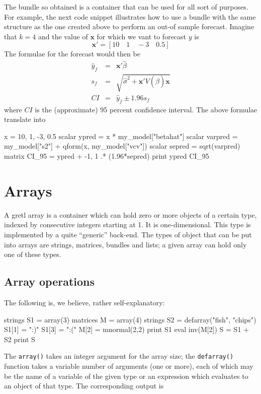 The bundle so obtained is a container that can be used for all sort of
purposes. For example, the next code snippet illustrates how to use
a bundle with the same structure as the one created above to perform
an out-of sample forecast. Imagine that $k=4$ and the value of
$\mathbf{x}$ for which we vant to forecast $y$ is
\[
  \mathbf{x}' = [ 10 \quad 1  \quad -3 \quad 0.5 ]
\]
The formulae for the forecast would then be
\begin{eqnarray*}
  \hat{y}_f & = & \mathbf{x}'\hat{\beta} \\
  s_f & = & \sqrt{\hat{\sigma}^2 + \mathbf{x}'V(\hat{\beta})\mathbf{x}} \\
  CI & = & \hat{y}_f \pm 1.96 s_f 
\end{eqnarray*}
where $CI$ is the (approximate) 95 percent confidence interval. The
above formulae translate into
\begin{code}
  x = { 10, 1, -3, 0.5 }
  scalar ypred    = x * my_model["betahat"]
  scalar varpred  = my_model["s2"] + qform(x, my_model["vcv"])
  scalar sepred   = sqrt(varpred)
  matrix CI_95    = ypred + {-1, 1} .* (1.96*sepred)
  print ypred CI_95
\end{code}

\section{Arrays}
\label{sec:arrays}

A gretl array is a container which can hold zero or more objects of a
certain type, indexed by consecutive integers starting at 1. It is
one-dimensional. This type is implemented by a quite ``generic''
back-end. The types of object that can be put into arrays are strings,
matrices, bundles and lists; a given array can hold only one of these
types.

\subsection{Array operations}

The following is, we believe, rather self-explanatory:

\begin{code}
strings S1 = array(3)
matrices M = array(4)
strings S2 = defarray("fish", "chips")
S1[1] = ":)"
S1[3] = ":("
M[2] = mnormal(2,2)
print S1
eval inv(M[2])
S = S1 + S2
print S
\end{code}

The \texttt{array()} takes an integer argument for the array size; the
\texttt{defarray()} function takes a variable number of arguments (one
or more), each of which may be the name of a variable of the given
type or an expression which evaluates to an object of that type.  The
corresponding output is


